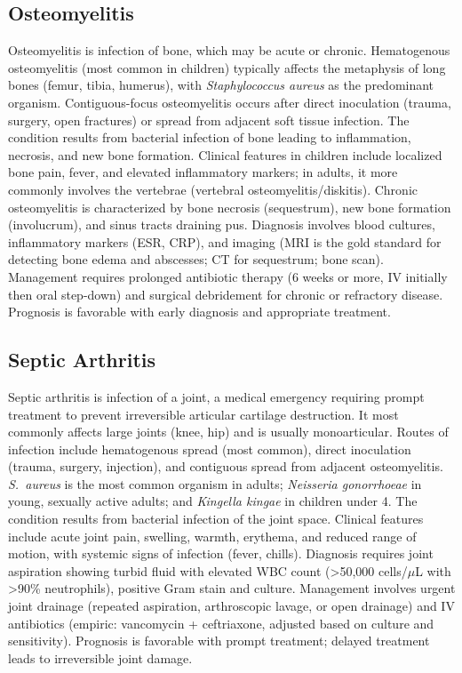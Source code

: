 \subsection{Osteomyelitis}
\label{sec:Osteomyelitis}
Osteomyelitis is infection of bone, which may be acute or chronic. Hematogenous osteomyelitis (most common in children) typically affects the metaphysis of long bones (femur, tibia, humerus), with \textit{Staphylococcus aureus} as the predominant organism. Contiguous-focus osteomyelitis occurs after direct inoculation (trauma, surgery, open fractures) or spread from adjacent soft tissue infection. The condition results from bacterial infection of bone leading to inflammation, necrosis, and new bone formation. Clinical features in children include localized bone pain, fever, and elevated inflammatory markers; in adults, it more commonly involves the vertebrae (vertebral osteomyelitis/diskitis). Chronic osteomyelitis is characterized by bone necrosis (sequestrum), new bone formation (involucrum), and sinus tracts draining pus. Diagnosis involves blood cultures, inflammatory markers (ESR, CRP), and imaging (MRI is the gold standard for detecting bone edema and abscesses; CT for sequestrum; bone scan). Management requires prolonged antibiotic therapy (6 weeks or more, IV initially then oral step-down) and surgical debridement for chronic or refractory disease. Prognosis is favorable with early diagnosis and appropriate treatment.

\subsection{Septic Arthritis}
\label{sec:Septic Arthritis}
Septic arthritis is infection of a joint, a medical emergency requiring prompt treatment to prevent irreversible articular cartilage destruction. It most commonly affects large joints (knee, hip) and is usually monoarticular. Routes of infection include hematogenous spread (most common), direct inoculation (trauma, surgery, injection), and contiguous spread from adjacent osteomyelitis. \textit{S.~aureus} is the most common organism in adults; \textit{Neisseria gonorrhoeae} in young, sexually active adults; and \textit{Kingella kingae} in children under 4. The condition results from bacterial infection of the joint space. Clinical features include acute joint pain, swelling, warmth, erythema, and reduced range of motion, with systemic signs of infection (fever, chills). Diagnosis requires joint aspiration showing turbid fluid with elevated WBC count (>50,000 cells/$\mu$L with >90\% neutrophils), positive Gram stain and culture. Management involves urgent joint drainage (repeated aspiration, arthroscopic lavage, or open drainage) and IV antibiotics (empiric: vancomycin + ceftriaxone, adjusted based on culture and sensitivity). Prognosis is favorable with prompt treatment; delayed treatment leads to irreversible joint damage.


